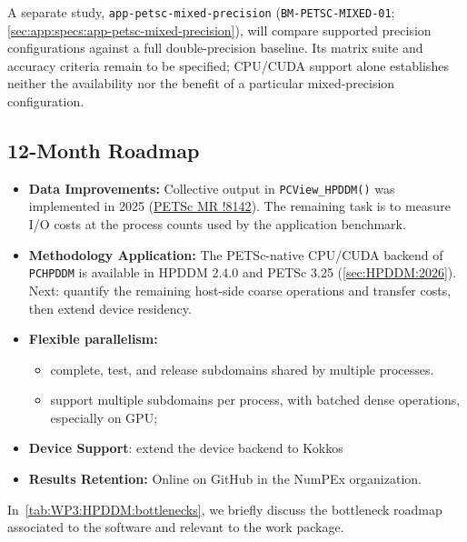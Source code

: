 A separate study, \texttt{app-petsc-mixed-precision}
(\texttt{BM-PETSC-MIXED-01}; \cref{sec:app:specs:app-petsc-mixed-precision}),
will compare supported precision configurations against a full
double-precision baseline. Its matrix suite and accuracy criteria remain
to be specified; CPU/CUDA support alone establishes neither the availability
nor the benefit of a particular mixed-precision configuration.

\subsection{12-Month Roadmap}
\label{sec:WP3:HPDDM:roadmap}

\begin{itemize}
    \item \textbf{Data Improvements:} Collective output in \verb!PCView_HPDDM()! was implemented in 2025 (\href{https://gitlab.com/petsc/petsc/-/merge_requests/8142}{PETSc MR !8142}). The remaining task is to measure I/O costs at the process counts used by the application benchmark.
    \item \textbf{Methodology Application:} The PETSc-native CPU/CUDA backend of \texttt{PCHPDDM} is available in HPDDM 2.4.0 and PETSc 3.25 (\cref{sec:HPDDM:2026}). Next: quantify the remaining host-side coarse operations and transfer costs, then extend device residency.
    \item \textbf{Flexible parallelism:}
        \begin{itemize}
            \item complete, test, and release subdomains shared by multiple processes.
            \item support multiple subdomains per process, with batched dense operations, especially on GPU;
        \end{itemize}
    \item \textbf{Device Support}: extend the device backend to Kokkos
    \item \textbf{Results Retention:} Online on GitHub in the NumPEx organization.
\end{itemize}

In~\cref{tab:WP3:HPDDM:bottlenecks}, we briefly discuss the bottleneck roadmap associated to the software and relevant to the work package.

